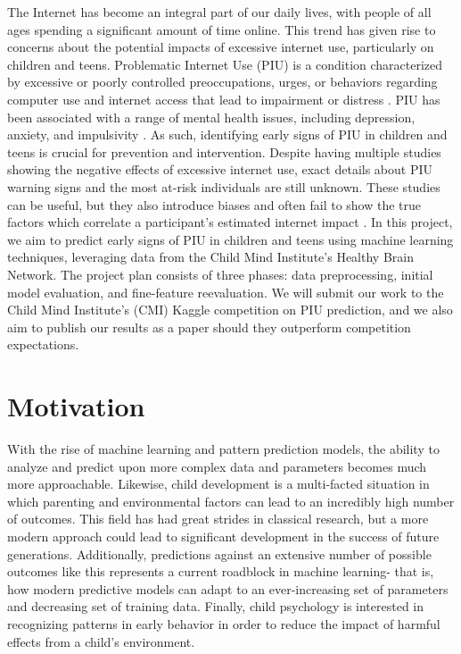 \documentclass[12pt]{extarticle}
\begin{document}
  The Internet has become an integral part of our daily lives, with people of all ages spending a significant amount of time online. 
  This trend has given rise to concerns about the potential impacts of excessive internet use, particularly on children and teens.
  Problematic Internet Use (PIU) is a condition characterized by excessive or poorly controlled preoccupations, urges, or behaviors regarding computer use and internet access that lead to impairment or distress \cite{Pettorruso2020-qt}. 
  PIU has been associated with a range of mental health issues, including depression, anxiety, and impulsivity \cite{Cash2012-rb}.
  As such, identifying early signs of PIU in children and teens is crucial for prevention and intervention.
  Despite having multiple studies showing the negative effects of excessive internet use, exact details about PIU warning signs and the most at-risk individuals are still unknown.
  These studies can be useful, but they also introduce biases and often fail to show the true factors which correlate a participant's estimated internet impact \cite{Restrepo2020-pb,Aboujaoude2010-mc}.
  In this project, we aim to predict early signs of PIU in children and teens using machine learning techniques, leveraging data from the Child Mind Institute's Healthy Brain Network.
  The project plan consists of three phases: data preprocessing, initial model evaluation, and fine-feature reevaluation.
  We will submit our work to the Child Mind Institute's (CMI) Kaggle competition on PIU prediction, and we also aim to publish our results as a paper should they outperform competition expectations.

\section{Motivation}

  With the rise of machine learning and pattern prediction models, the ability to analyze and predict upon more complex data and parameters becomes much more approachable.
  Likewise, child development is a multi-facted situation in which parenting and environmental factors can lead to an incredibly high number of outcomes.
  This field has had great strides in classical research, but a more modern approach could lead to significant development in the success of future generations.
  Additionally, predictions against an extensive number of possible outcomes like this represents a current roadblock in machine learning- that is, how modern predictive models can adapt to an ever-increasing set of parameters and decreasing set of training data.
  Finally, child psychology is interested in recognizing patterns in early behavior in order to reduce the impact of harmful effects from a child's environment.
\end{document}
